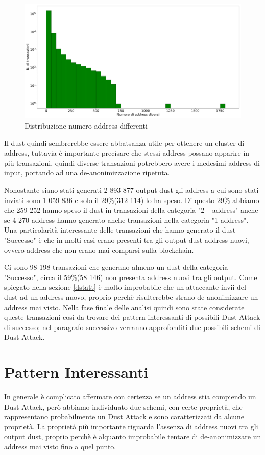  \begin{figure}[h!]
     \centering
     \includegraphics[scale=0.3]{Grafici/num_addr.pdf}
     \caption{Distribuzione numero address differenti}
     \label{fig:diff_addr}
     \subcaption{La prima colonna rappresenta l'intervallo (1, 50]}
 \end{figure}
\FloatBarrier
Il dust quindi sembrerebbe essere abbatsanza utile per ottenere un cluster di address, tuttavia è importante precisare che stessi address possano apparire in più transazioni, quindi diverse transazioni potrebbero avere i medesimi address di input, portando ad una de-anonimizzazione ripetuta. 

Nonostante siano stati generati 2 893 877 output dust gli address a cui sono stati inviati sono 1 059 836 e solo il 29\%(312 114) lo ha speso. Di questo 29\% abbiamo che 259 252 hanno speso il dust in transazioni della categoria "2+ address" anche se 4 270 address hanno generato anche transazioni nella categoria "1 address". Una particolarità interessante delle transazioni che hanno generato il dust "Successo" è che in molti casi erano presenti tra gli output dust address nuovi, ovvero address che non erano mai comparsi sulla blockchain. 

Ci sono 98 198 transazioni che generano almeno un dust della categoria "Successo", circa il 59\%(58 146) non presenta address nuovi tra gli output. Come spiegato nella sezione \ref{dstatt} è molto improbabile che un attaccante invii del dust ad un address nuovo, proprio perchè risulterebbe strano de-anonimizzare un address mai visto. Nella fase finale delle analisi quindi sono state considerate queste transazioni così da trovare dei pattern interessanti di possibili Dust Attack di successo; nel paragrafo successivo verranno approfonditi due possibili schemi di Dust Attack.  
\section{Pattern Interessanti}
In generale è complicato affermare con certezza se un address stia compiendo un Dust Attack, però abbiamo individuato due schemi, con certe proprietà, che rappresentano probabilmente un Dust Attack e sono caratterizzati da alcune proprietà. La proprietà più importante riguarda l'assenza di address nuovi tra gli output dust, proprio perchè è alquanto improbabile tentare di de-anonimizzare un address mai visto fino a quel punto.

